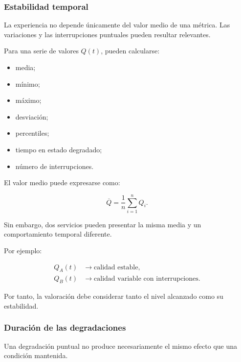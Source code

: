 \subsubsection*{Estabilidad temporal}

La experiencia no depende únicamente del valor medio de una métrica. Las
variaciones y las interrupciones puntuales pueden resultar relevantes.

Para una serie de valores \(Q(t)\), pueden calcularse:

\begin{itemize}
    \item media;

    \item mínimo;

    \item máximo;

    \item desviación;

    \item percentiles;

    \item tiempo en estado degradado;

    \item número de interrupciones.
\end{itemize}

El valor medio puede expresarse como:

\[
    \overline{Q}
    =
    \frac{1}{n}
    \sum_{i=1}^{n}
    Q_i.
\]

Sin embargo, dos servicios pueden presentar la misma media y un
comportamiento temporal diferente.

Por ejemplo:

\[
\begin{aligned}
    Q_A(t)
    &\longrightarrow
    \text{calidad estable},\\
    Q_B(t)
    &\longrightarrow
    \text{calidad variable con interrupciones}.
\end{aligned}
\]

Por tanto, la valoración debe considerar tanto el nivel alcanzado como su
estabilidad.


\subsubsection*{Duración de las degradaciones}

Una degradación puntual no produce necesariamente el mismo efecto que una
condición mantenida.

